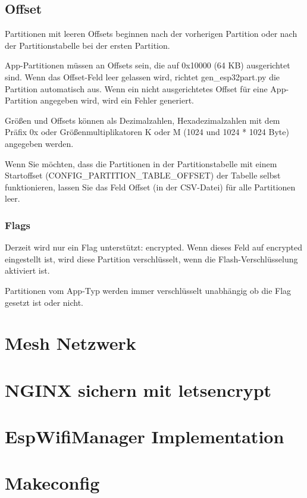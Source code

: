 \subsection{Offset}
Partitionen mit leeren Offsets beginnen nach der vorherigen Partition oder nach der Partitionstabelle bei der ersten Partition.

App-Partitionen müssen an Offsets sein, die auf 0x10000 (64 KB) ausgerichtet sind. Wenn das Offset-Feld leer gelassen wird, richtet gen\_esp32part.py die Partition automatisch aus. Wenn ein nicht ausgerichtetes Offset für eine App-Partition angegeben wird, wird ein Fehler generiert.

Größen und Offsets können als Dezimalzahlen, Hexadezimalzahlen mit dem Präfix 0x oder Größenmultiplikatoren K oder M (1024 und 1024 * 1024 Byte) angegeben werden.

Wenn Sie möchten, dass die Partitionen in der Partitionstabelle mit einem Startoffset (CONFIG\_PARTITION\_TABLE\_OFFSET) der Tabelle selbst funktionieren, lassen Sie das Feld Offset (in der CSV-Datei) für alle Partitionen leer.

\subsubsection{Flags}
Derzeit wird nur ein Flag unterstützt: encrypted. Wenn dieses Feld auf encrypted eingestellt ist, wird diese Partition verschlüsselt, wenn die Flash-Verschlüsselung aktiviert ist.

Partitionen vom App-Typ werden immer verschlüsselt unabhängig ob die Flag gesetzt ist oder nicht.\cite{espressif_partition_tables}

\section{Mesh Netzwerk}\label{sec:mesh}

\section{NGINX sichern mit letsencrypt}

\section{EspWifiManager Implementation}

\section{Makeconfig}

